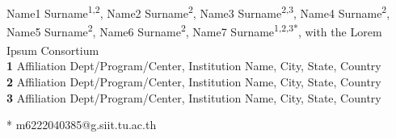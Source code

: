 \documentclass[10pt,letterpaper]{article}
\begin{document}
	\vspace*{0.2in}
	
	\begin{flushleft}
		{\Large
			\textbf{} %
		}
		\newline
		\\
		Name1 Surname\textsuperscript{1,2\Yinyang},
		Name2 Surname\textsuperscript{2\Yinyang},
		Name3 Surname\textsuperscript{2,3\textcurrency},
		Name4 Surname\textsuperscript{2},
		Name5 Surname\textsuperscript{2\ddag},
		Name6 Surname\textsuperscript{2\ddag},
		Name7 Surname\textsuperscript{1,2,3*},
		with the Lorem Ipsum Consortium\textsuperscript{\textpilcrow}
		\\
		\bigskip
		\textbf{1} Affiliation Dept/Program/Center, Institution Name, City, State, Country
		\\
		\textbf{2} Affiliation Dept/Program/Center, Institution Name, City, State, Country
		\\
		\textbf{3} Affiliation Dept/Program/Center, Institution Name, City, State, Country
		\\
		\bigskip
		

		* m6222040385@g.siit.tu.ac.th
		
	\end{flushleft}
\end{document}
